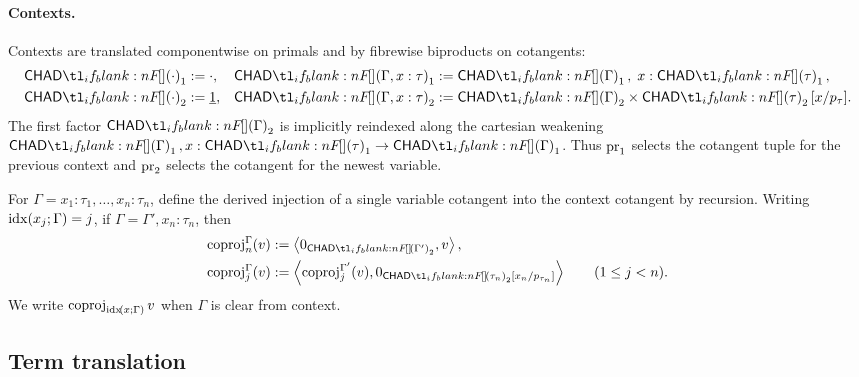 \documentclass[11pt,a4paper]{article}
\theoremstyle{definition}
\theoremstyle{remark}
\providecommand{\casubst}[3]{#1[#3/#2]}
\providecommand{\lintype}[1]{\underline{#1}}
\begin{document}
\paragraph{Contexts.}
Contexts are translated componentwise on primals and by fibrewise biproducts on
cotangents:
\begin{equation}
  \label{eq:appendix-chad-context-translation}
  \begin{aligned}
    \Fun[np]{\chad}{\cdot}_{1} &:= \cdot,
    &
    \Fun[np]{\chad}{\Gamma, x : \tau}_{1}
    &:=
    \Fun[np]{\chad}{\Gamma}_{1},\; x : \Fun[np]{\chad}{\tau}_{1},
    \\
    \Fun[np]{\chad}{\cdot}_{2} &:= \lintype{1},
    &
    \Fun[np]{\chad}{\Gamma, x : \tau}_{2}
    &:=
    \Fun[np]{\chad}{\Gamma}_{2}
    \times
    \casubst{\Fun[np]{\chad}{\tau}_{2}}{p_{\tau}}{x}.
  \end{aligned}
\end{equation}
The first factor \(\Fun[np]{\chad}{\Gamma}_{2}\) is implicitly reindexed
along the cartesian weakening
\(\Fun[np]{\chad}{\Gamma}_{1},x:\Fun[np]{\chad}{\tau}_{1}\to
\Fun[np]{\chad}{\Gamma}_{1}\).  Thus \(\opn[b]{pr}_{1}\) selects the cotangent
tuple for the previous context and \(\opn[b]{pr}_{2}\) selects the cotangent for
the newest variable.

For \(\Gamma = x_{1}:\tau_{1},\dots,x_{n}:\tau_{n}\), define the derived
injection of a single variable cotangent into the context cotangent by recursion.
Writing \(\fn[n]{\opn{idx}}{x_{j};\Gamma}=j\), if
\(\Gamma=\Gamma',x_{n}:\tau_{n}\), then
\begin{equation}
  \label{eq:appendix-chad-coproj-definition}
  \begin{aligned}
    \opn[b]{coproj}^{\Gamma}_{n}(v)
    &:=
    \tuple{
      \opn[b]{0}_{\Fun[np]{\chad}{\Gamma'}_{2}},
      v
    },
    \\
    \opn[b]{coproj}^{\Gamma}_{j}(v)
    &:=
    \tuple{
      \opn[b]{coproj}^{\Gamma'}_{j}(v),
      \opn[b]{0}_{\casubst{\Fun[np]{\chad}{\tau_{n}}_{2}}{p_{\tau_n}}{x_{n}}}
    }
    \qquad (1\leq j<n).
  \end{aligned}
\end{equation}
We write \(\opn[b]{coproj}_{\fn[n]{\opn{idx}}{x;\Gamma}}v\) when \(\Gamma\) is
clear from context.

\subsection{Term translation}
\end{document}
